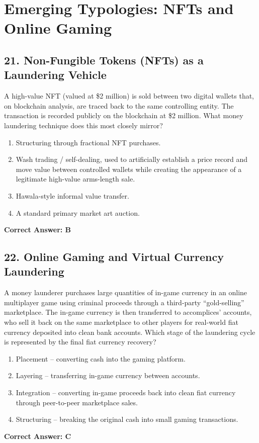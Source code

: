 \documentclass[11pt,a4paper]{article}
\begin{document}
	\section{Emerging Typologies: NFTs and Online Gaming}
	
	\subsection{21. Non-Fungible Tokens (NFTs) as a Laundering Vehicle}
	A high-value NFT (valued at \$2 million) is sold between two digital wallets that, on blockchain analysis, are traced back to the same controlling entity. The transaction is recorded publicly on the blockchain at \$2 million. What money laundering technique does this most closely mirror?
	\begin{enumerate}[label=\Alph*.]
		\item Structuring through fractional NFT purchases.
		\item Wash trading / self-dealing, used to artificially establish a price record and move value between controlled wallets while creating the appearance of a legitimate high-value arms-length sale.
		\item Hawala-style informal value transfer.
		\item A standard primary market art auction.
	\end{enumerate}
	\textbf{Correct Answer: B}
	
	\subsection{22. Online Gaming and Virtual Currency Laundering}
	A money launderer purchases large quantities of in-game currency in an online multiplayer game using criminal proceeds through a third-party ``gold-selling'' marketplace. The in-game currency is then transferred to accomplices' accounts, who sell it back on the same marketplace to other players for real-world fiat currency deposited into clean bank accounts. Which stage of the laundering cycle is represented by the final fiat currency recovery?
	\begin{enumerate}[label=\Alph*.]
		\item Placement -- converting cash into the gaming platform.
		\item Layering -- transferring in-game currency between accounts.
		\item Integration -- converting in-game proceeds back into clean fiat currency through peer-to-peer marketplace sales.
		\item Structuring -- breaking the original cash into small gaming transactions.
	\end{enumerate}
	\textbf{Correct Answer: C}
	
\end{document}

